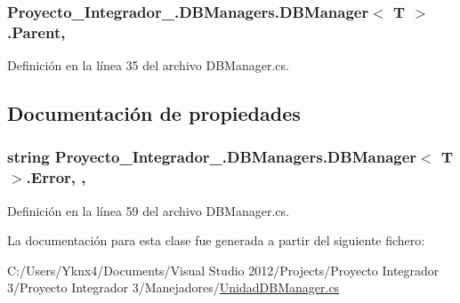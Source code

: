 \hypertarget{class_proyecto___integrador__3_1_1_d_b_managers_1_1_d_b_manager_3_01_t_01_4_a06315e75298c8f2fd46f32dc7c9a80b2}{
\subsubsection[{Parent}]{ Proyecto\-\_\-\-Integrador\-\_.\-D\-B\-Managers.\-D\-B\-Manager$<$ T $>$.Parent\hspace{0.3cm}{\ttfamily [protected]}, {\ttfamily [inherited]}}}\label{class_proyecto___integrador__3_1_1_d_b_managers_1_1_d_b_manager_3_01_t_01_4_a06315e75298c8f2fd46f32dc7c9a80b2}


Definición en la línea 35 del archivo D\-B\-Manager.\-cs.



\subsection{Documentación de propiedades}
\hypertarget{class_proyecto___integrador__3_1_1_d_b_managers_1_1_d_b_manager_3_01_t_01_4_a6e5caaed2ee1a4d067dfbf5aaa1b1fa8}{
\subsubsection[{Error}]{\setlength{\rightskip}{0pt plus 5cm}string Proyecto\-\_\-\-Integrador\-\_.\-D\-B\-Managers.\-D\-B\-Manager$<$ T $>$.Error\hspace{0.3cm}{\ttfamily [get]}, {\ttfamily [set]}, {\ttfamily [inherited]}}}\label{class_proyecto___integrador__3_1_1_d_b_managers_1_1_d_b_manager_3_01_t_01_4_a6e5caaed2ee1a4d067dfbf5aaa1b1fa8}


Definición en la línea 59 del archivo D\-B\-Manager.\-cs.



La documentación para esta clase fue generada a partir del siguiente fichero\-:\begin{DoxyCompactItemize}
\item 
C\-:/\-Users/\-Yknx4/\-Documents/\-Visual Studio 2012/\-Projects/\-Proyecto Integrador 3/\-Proyecto Integrador 3/\-Manejadores/\hyperlink{_unidad_d_b_manager_8cs}{Unidad\-D\-B\-Manager.\-cs}\end{DoxyCompactItemize}
